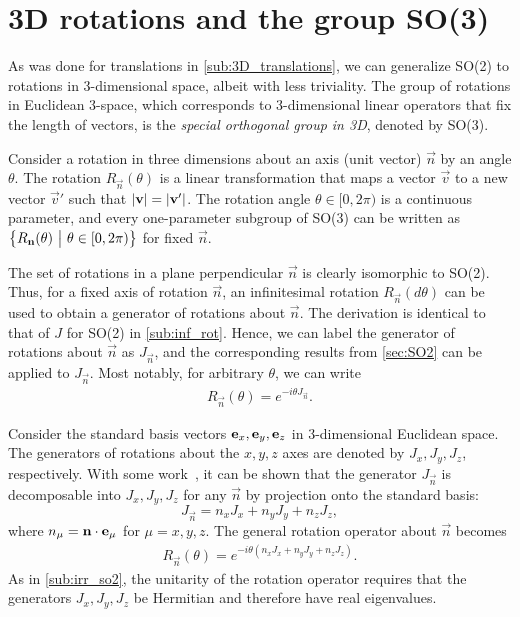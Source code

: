 \section{3D rotations and the group SO(3)}\label{sec:SO3}
As was done for translations in \cref{sub:3D_translations}, we can generalize SO(2) to rotations in 3-dimensional space, albeit with less triviality. The group of rotations in Euclidean 3-space, which corresponds to 3-dimensional linear operators that fix the length of vectors, is the \textit{special orthogonal group in 3D}, denoted by SO(3).

Consider a rotation in three dimensions about an axis (unit vector) $\vec{n}$ by an angle $\theta$. The rotation $R_{\vec{n}}(\theta)$ is a linear transformation that maps a vector $\vec{v}$ to a new vector $\vec{v}'$ such that $\left|\mathbf{v}\right|=\left|\mathbf{v}'\right|$. The rotation angle $\theta\in[0,2\pi)$ is a continuous parameter, and every one-parameter subgroup of SO(3) can be written as $\left\{ R_{\mathbf{n}}(\theta) ~\big|~ \theta\in[0,2\pi) \right\}$ for fixed $\vec{n}$.

The set of rotations in a plane perpendicular $\vec{n}$ is clearly isomorphic to SO(2). Thus, for a fixed axis of rotation $\vec{n}$, an infinitesimal rotation $R_{\vec{n}}(d\theta)$ can be used to obtain a generator of rotations about $\vec{n}$. The derivation is identical to that of $J$ for SO(2) in \cref{sub:inf_rot}. Hence, we can label the generator of rotations about $\vec{n}$ as $J_{\vec{n}}$, and the corresponding results from \cref{sec:SO2} can be applied to $J_{\vec{n}}$. Most notably, for arbitrary $\theta$, we can write
\begin{align*}
    R_{\vec{n}}(\theta) = e^{-i\theta J_{\vec{n}}}.
\end{align*}

Consider the standard basis vectors $\mathbf{e}_x,\mathbf{e}_y,\mathbf{e}_z$ in 3-dimensional Euclidean space. The generators of rotations about the $x,y,z$ axes are denoted by $J_x,J_y,J_z$, respectively. With some work~\cite{Tung1985}, it can be shown that the generator $J_{\vec{n}}$ is decomposable into $J_x,J_y,J_z$ for any $\vec{n}$ by projection onto the standard basis:
\begin{equation}
    J_{\vec{n}} = n_x J_x + n_y J_y + n_z J_z,
\end{equation}
where $n_\mu = \mathbf{n}\cdot\mathbf{e}_\mu$ for $\mu=x,y,z$.
The general rotation operator about $\vec{n}$ becomes
\begin{align*}
    R_{\vec{n}}(\theta) = e^{-i\theta(n_x J_x + n_y J_y + n_z J_z)}.
\end{align*}
As in \cref{sub:irr_so2}, the unitarity of the rotation operator requires that the generators $J_x,J_y,J_z$ be Hermitian and therefore have real eigenvalues.

